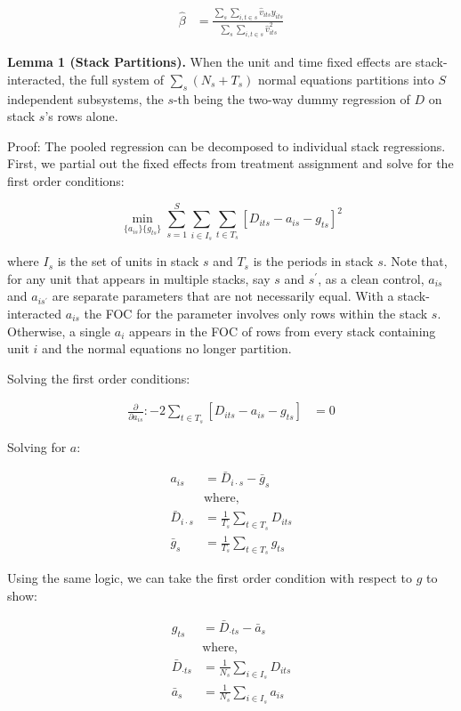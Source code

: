\documentclass[12pt]{article}
\begin{document}
\begin{align*}
    \hat{\beta} &= \frac{\sum_s \sum_{i,t\in s} \hat{v}_{its} y_{its}}{\sum_s \sum_{i,t\in s} \hat{v}^2_{its}}
\end{align*}

\textbf{Lemma 1 (Stack Partitions).} When the unit and time fixed effects are stack-interacted, the full system of $\sum_s (N_s + T_s)$ normal equations partitions into $S$ independent subsystems, the $s$-th being the two-way dummy regression of $D$ on stack $s$'s rows alone.

Proof: The pooled regression can be decomposed to individual stack regressions. First, we partial out the fixed effects from treatment assignment and solve for the first order conditions:

\begin{equation*}
    \min_{\{a_{is}\}\{g_{ts}\}} \sum_{s=1}^S \sum_{i \in I_s} \sum_{t \in  T_s}[D_{its} - a_{is} - g_{ts}]^2
\end{equation*}

where $I_s$ is the set of units in stack $s$ and $T_s$ is the periods in stack $s$. Note that, for any unit that appears in multiple stacks, say $s$ and $s^\prime$, as a clean control, $a_{is}$ and $ a_{is^\prime}$ are separate parameters that are not necessarily equal. With a stack-interacted $a_{is}$ the FOC for the parameter involves only rows within the stack $s$. Otherwise, a single $a_i$ appears in the FOC of rows from every stack containing unit $i$ and the normal equations no longer partition.

Solving the first order conditions:

\begin{align*}
    \frac{\partial}{\partial a_{is}} : -2 \sum_{t \in  T_s}[D_{its} - a_{is} - g_{ts}] &= 0
\end{align*}

Solving for $a$:

\begin{align*}
    a_{is} &= \bar{D}_{i \cdot s} - \bar{g}_s \\
    &\text{where,} \\
    \bar{D}_{i \cdot s} &= \frac{1}{T_s} \sum_{t \in  T_s} D_{its} \\
    \bar{g}_s &= \frac{1}{T_s} \sum_{t \in  T_s} g_{ts}
\end{align*}

Using the same logic, we can take the first order condition with respect to $g$ to show:

\begin{align*}
     g_{ts} &= \bar{D}_{\cdot t s} - \bar{a}_s \\
    &\text{where,} \\
    \bar{D}_{\cdot t s} &= \frac{1}{N_s} \sum_{i \in  I_s} D_{its} \\
    \bar{a}_s &= \frac{1}{N_s} \sum_{i \in I_s} a_{is}
\end{align*}
\end{document}
